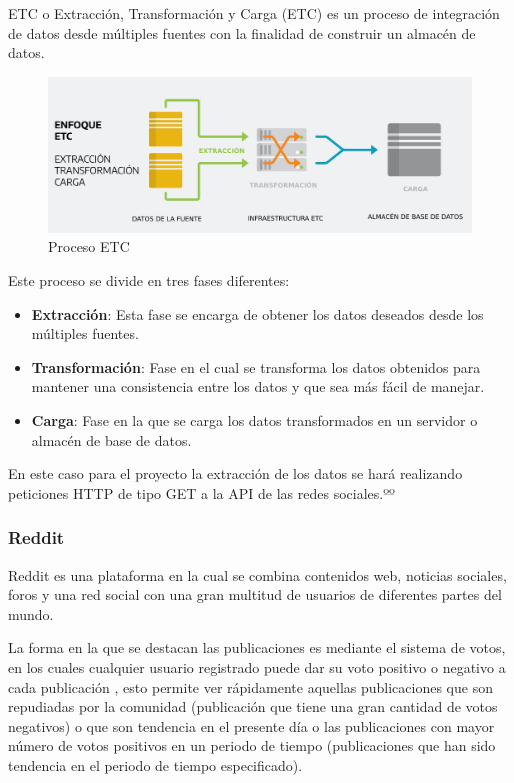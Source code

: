 \documentclass[../../main.tex]{subfiles}
\begin{document}
ETC o Extracción, Transformación y Carga (ETC) es un proceso de integración de datos desde múltiples fuentes con la finalidad de construir un almacén de datos.

\begin{figure}[h]
\centering
\includegraphics[width=1\textwidth]{images/4_sistema/etl.png}
\caption{Proceso ETC}
\end{figure}

Este proceso se divide en tres fases diferentes:

\begin{itemize}
    \item \textbf{Extracción}: Esta fase se encarga de obtener los datos deseados desde los múltiples fuentes.
    \item \textbf{Transformación}: Fase en el cual se transforma los datos obtenidos para mantener una consistencia entre los datos y que sea más fácil de manejar.
    \item \textbf{Carga}: Fase en la que se carga los datos transformados en un servidor o almacén de base de datos.
\end{itemize}


En este caso para el proyecto la extracción de los datos se hará realizando peticiones HTTP de tipo GET a la API de las redes sociales.ºº

\subsubsection{Reddit}

Reddit\cite{doc18} es una plataforma en la cual se combina contenidos web, noticias sociales, foros y una red social con una gran multitud de usuarios de diferentes partes del mundo.

La forma en la que se destacan las publicaciones es mediante el sistema de votos, en los cuales cualquier usuario registrado puede dar su voto positivo o negativo a cada publicación , esto permite ver rápidamente aquellas publicaciones que son repudiadas por la comunidad (publicación que tiene una gran cantidad de votos negativos) o que son tendencia en el presente día o las publicaciones con mayor número de votos positivos en un periodo de tiempo (publicaciones que han sido tendencia en el periodo de tiempo especificado).
\end{document}
